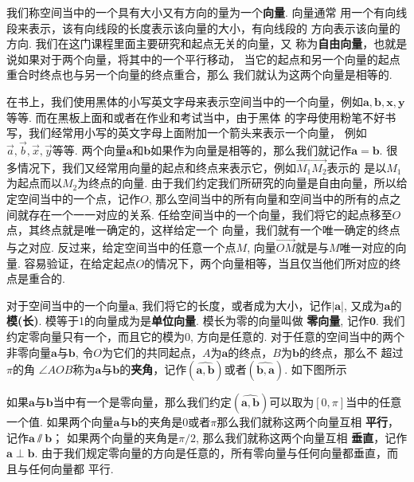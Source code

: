 \documentclass[a4paper, titlepage, twoside]{article}
\numberwithin{equation}{section}
\begin{document}
\begin{definition}
	我们称空间当中的一个具有大小又有方向的量为一个{\bf 向量}. 向量通常
	用一个有向线段来表示，该有向线段的长度表示该向量的大小，有向线段的
	方向表示该向量的方向. 我们在这门课程里面主要研究和起点无关的向量，又
	称为{\bf 自由向量}，也就是说如果对于两个向量，将其中的一个平行移动，
	当它的起点和另一个向量的起点重合时终点也与另一个向量的终点重合，那么
	我们就认为这两个向量是相等的.  
\end{definition}


在书上，我们使用黑体的小写英文字母来表示空间当中的一个向量，例如$\pmb{a},
\pmb{b}, \pmb{x}, \pmb{y}$等等. 而在黑板上面和或者在作业和考试当中，由于黑体
的字母使用粉笔不好书写，我们经常用小写的英文字母上面附加一个箭头来表示一个向量，
例如$\vec{a}, \vec{b}, \vec{x}, \vec{y}$等等.
两个向量$\pmb{a}$和$\pmb{b}$如果作为向量是相等的，那么我们就记作$\pmb{a}=\pmb{b}$. 
很多情况下，我们又经常用向量的起点和终点来表示它，例如$\overrightarrow{M_1M_2}$表示的
是以$M_1$为起点而以$M_2$为终点的向量.
由于我们约定我们所研究的向量是自由向量，所以给定空间当中的一个点，记作$O$,
那么空间当中的所有向量和空间当中的所有的点之间就存在一个一一对应的关系.
任给空间当中的一个向量，我们将它的起点移至$O$点，其终点就是唯一确定的，这样给定一个
向量，我们就有一个唯一确定的终点与之对应.
反过来，给定空间当中的任意一个点$M$,
向量$\overrightarrow{OM}$就是与$M$唯一对应的向量.
容易验证，在给定起点$O$的情况下，两个向量相等，当且仅当他们所对应的终点是重合的. 

\begin{definition}
	对于空间当中的一个向量$\pmb{a}$,
	我们将它的长度，或者成为大小，记作$|\pmb{a}|$, 又成为$\pmb{a}$的{\bf
	模(长)}. 模等于1的向量成为是{\bf 单位向量}. 模长为零的向量叫做{\bf
	零向量}, 记作$\pmb{0}$. 我们约定零向量只有一个，而且它的模为$0$,
	方向是任意的. 对于任意的空间当中的两个非零向量$\pmb{a}$与$\pmb{b}$,
	令$O$为它们的共同起点，$A$为$\pmb{a}$的终点，$B$为$\pmb{b}$的终点，那么不
	超过$\pi$的角
	$\angle AOB$称为$\pmb{a}$与$\pmb{b}$的{\bf 夹角}，记作$(\widehat{\pmb{a},
	\pmb{b}})$或者$(\widehat{\pmb{b},\pmb{a}})$. 如下图所示
	\begin{center}
	\end{center}
	如果$\pmb{a}$与$\pmb{b}$当中有一个是零向量，那么我们约定$(\widehat{\pmb{a},
	\pmb{b}})$可以取为$[0,\pi]$当中的任意一个值.
	如果两个向量$\pmb{a}$与$\pmb{b}$的夹角是$0$或者$\pi$那么我们就称这两个向量互相{\bf
	平行}，记作$\pmb{a}\sslash \pmb{b}$；
	如果两个向量的夹角是$\pi/2$, 那么我们就称这两个向量互相{\bf
	垂直}，记作$\pmb{a} \perp \pmb{b}$.
	由于我们规定零向量的方向是任意的，所有零向量与任何向量都垂直，而且与任何向量都
	平行.
\end{definition}
\end{document}
